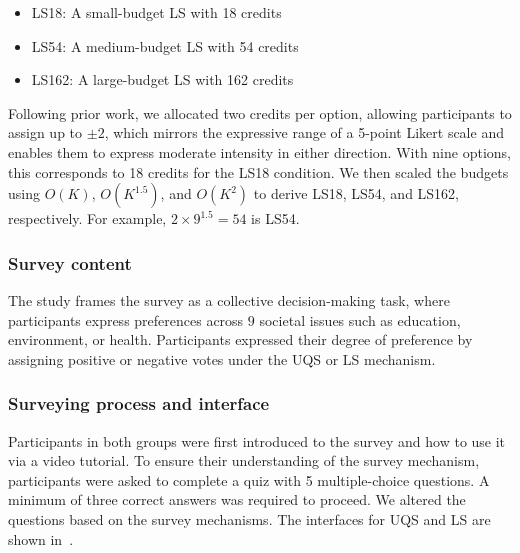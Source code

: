 \begin{itemize} 
    \item LS18: A small-budget LS with 18 credits
    \item LS54: A medium-budget LS with 54 credits
    \item LS162: A large-budget LS with 162 credits
\end{itemize}

Following prior work, we allocated two credits per option, allowing participants to assign up to $\pm2$, which mirrors the expressive range of a 5-point Likert scale and enables them to express moderate intensity in either direction. With nine options, this corresponds to 18 credits for the LS18 condition. We then scaled the budgets using $O(K)$, $O(K^{1.5})$, and $O(K^2)$ to derive LS18, LS54, and LS162, respectively. For example, $2 \times 9^{1.5} = 54$ is LS54.

\subsubsection{Survey content}
The study frames the survey as a collective decision-making task, where participants express preferences across $9$ societal issues such as education, environment, or health. Participants expressed their degree of preference by assigning positive or negative votes under the UQS or LS mechanism.

\subsubsection{Surveying process and interface}
Participants in both groups were first introduced to the survey and how to use it via a video tutorial. To ensure their understanding of the survey mechanism, participants were asked to complete a quiz with 5 multiple-choice questions. A minimum of three correct answers was required to proceed. We altered the questions based on the survey mechanisms. The interfaces for UQS and LS are shown in~.


